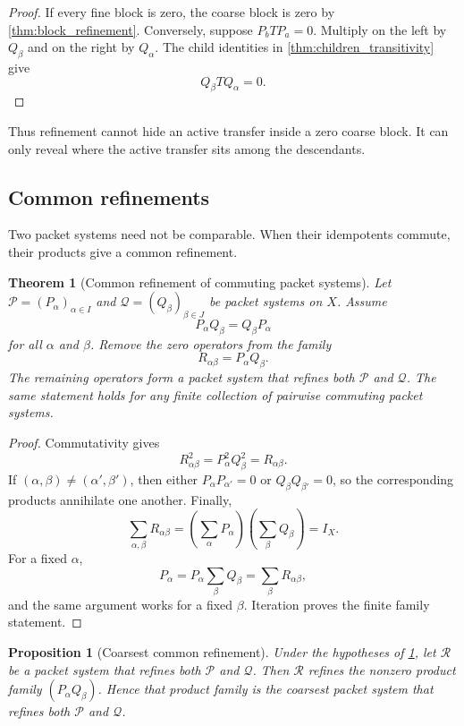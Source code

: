 \documentclass{aomart}
\newtheorem{theorem}{Theorem}[section]
\newtheorem{proposition}[proposition]{Proposition}
\theoremstyle{definition}
\theoremstyle{remark}
\newcommand{\Pcal}{\mathcal P}
\newcommand{\Qcal}{\mathcal Q}
\newcommand{\Rcal}{\mathcal R}
\begin{document}
\begin{proof}
If every fine block is zero, the coarse block is zero by \cref{thm:block_refinement}.  Conversely, suppose $P_bTP_a=0$.  Multiply on the left by $Q_\beta$ and on the right by $Q_\alpha$.  The child identities in \cref{thm:children_transitivity} give
\[
Q_\beta TQ_\alpha=0.
\]
\end{proof}

Thus refinement cannot hide an active transfer inside a zero coarse block.  It can only reveal where the active transfer sits among the descendants.

\subsection{Common refinements}

Two packet systems need not be comparable.  When their idempotents commute, their products give a common refinement.

\begin{theorem}[Common refinement of commuting packet systems]\label{thm:common_refinement}
Let $\Pcal=(P_\alpha)_{\alpha\in I}$ and $\Qcal=(Q_\beta)_{\beta\in J}$ be packet systems on $X$.  Assume
\[
P_\alpha Q_\beta=Q_\beta P_\alpha
\]
for all $\alpha$ and $\beta$.  Remove the zero operators from the family
\[
R_{\alpha\beta}=P_\alpha Q_\beta.
\]
The remaining operators form a packet system that refines both $\Pcal$ and $\Qcal$.  The same statement holds for any finite collection of pairwise commuting packet systems.
\end{theorem}

\begin{proof}
Commutativity gives
\[
R_{\alpha\beta}^2=P_\alpha^2Q_\beta^2=R_{\alpha\beta}.
\]
If $(\alpha,\beta)\ne(\alpha',\beta')$, then either $P_\alpha P_{\alpha'}=0$ or $Q_\beta Q_{\beta'}=0$, so the corresponding products annihilate one another.  Finally,
\[
\sum_{\alpha,\beta}R_{\alpha\beta}
=
\left(\sum_\alpha P_\alpha\right)
\left(\sum_\beta Q_\beta\right)
=I_X.
\]
For a fixed $\alpha$,
\[
P_\alpha
=P_\alpha\sum_\beta Q_\beta
=
\sum_\beta R_{\alpha\beta},
\]
and the same argument works for a fixed $\beta$.  Iteration proves the finite family statement.
\end{proof}

\begin{proposition}[Coarsest common refinement]\label{prop:coarsest_common_refinement}
Under the hypotheses of \cref{thm:common_refinement}, let $\Rcal$ be a packet system that refines both $\Pcal$ and $\Qcal$.  Then $\Rcal$ refines the nonzero product family $(P_\alpha Q_\beta)$.  Hence that product family is the coarsest packet system that refines both $\Pcal$ and $\Qcal$.
\end{proposition}
\end{document}
